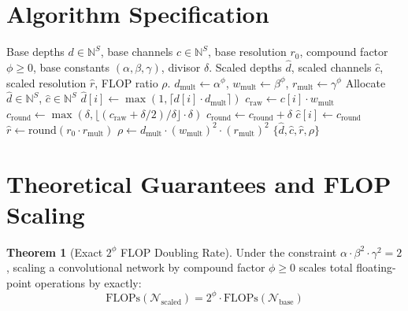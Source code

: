 \documentclass[11pt,a4paper]{article}
\theoremstyle{definition}
\newtheorem{theorem}{Theorem}[section]
\begin{document}
\section{Algorithm Specification}

\begin{algorithm}[H]
\caption{Compound Architecture Scaling Execution}
\label{alg:compound_scaling}
\begin{algorithmic}[1]
\Require Base depths $d \in \mathbb{N}^S$, base channels $c \in \mathbb{N}^S$, base resolution $r_0$, compound factor $\phi \ge 0$, base constants $(\alpha, \beta, \gamma)$, divisor $\delta$.
\Ensure Scaled depths $\hat{d}$, scaled channels $\hat{c}$, scaled resolution $\hat{r}$, FLOP ratio $\rho$.
\State $d_{\text{mult}} \gets \alpha^\phi$, $w_{\text{mult}} \gets \beta^\phi$, $r_{\text{mult}} \gets \gamma^\phi$
\State Allocate $\hat{d} \in \mathbb{N}^S$, $\hat{c} \in \mathbb{N}^S$
    \State $\hat{d}[i] \gets \max(1, \lceil d[i] \cdot d_{\text{mult}} \rceil)$
    \State $c_{\text{raw}} \gets c[i] \cdot w_{\text{mult}}$
    \State $c_{\text{round}} \gets \max(\delta, \lfloor (c_{\text{raw}} + \delta / 2) / \delta \rfloor \cdot \delta)$
        \State $c_{\text{round}} \gets c_{\text{round}} + \delta$
    \EndIf
    \State $\hat{c}[i] \gets c_{\text{round}}$
\EndFor
\State $\hat{r} \gets \text{round}(r_0 \cdot r_{\text{mult}})$
\State $\rho \gets d_{\text{mult}} \cdot (w_{\text{mult}})^2 \cdot (r_{\text{mult}})^2$
\State \Return $\{\hat{d}, \hat{c}, \hat{r}, \rho\}$
\end{algorithmic}
\end{algorithm}

\section{Theoretical Guarantees and FLOP Scaling}

\begin{theorem}[Exact $2^\phi$ FLOP Doubling Rate]
Under the constraint $\alpha \cdot \beta^2 \cdot \gamma^2 = 2$, scaling a convolutional network by compound factor $\phi \ge 0$ scales total floating-point operations by exactly:
\begin{equation}
\text{FLOPs}(\mathcal{N}_{\text{scaled}}) = 2^\phi \cdot \text{FLOPs}(\mathcal{N}_{\text{base}})
\end{equation}
\end{theorem}
\end{document}
